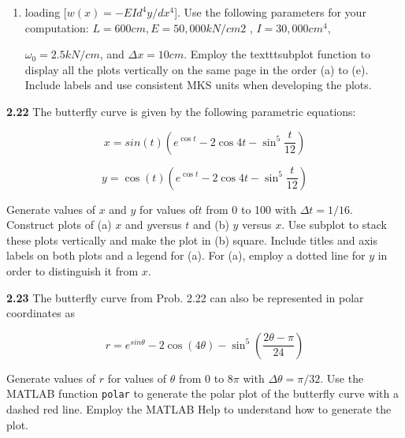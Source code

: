 \documentclass[../main.tex]{subfiles}
\begin{document}
\begin{multicols}{2}
\begin{enumerate}[label=(\alph*)]
\item loading [$w(x) = -EId^4 y/dx^4$].
Use the following parameters for your computation:
$L = 600 cm, E = 50,000 kN/cm2$ , $I = 30,000 cm^4$,

$\omega_0 = 2.5 kN/cm$, and $\Delta x = 10 cm$. Employ the texttt{subplot}
function to display all the plots vertically on the same page
in the order (a) to (e). Include labels and use consistent MKS
units when developing the plots.
\end{enumerate}

\textbf{2.22} The butterfly curve is given by the following parametric equations:

$$x = sin(t)\left( e^{\cos t} - 2 \cos 4t - \sin^5 \dfrac{t}{12} \right)$$

$$y = \cos(t)\left( e^{\cos t} - 2 \cos 4t - \sin^5 \dfrac{t}{12} \right)$$

Generate values of $x$ and $y$ for values of$ t$ from 0 to 100 with
$\Delta t = 1/16$. Construct plots of (a) $x$ and $y $versus $t$ and (b) $y$
versus $x$. Use subplot to stack these plots vertically and
make the plot in (b) square. Include titles and axis labels on
both plots and a legend for (a). For (a), employ a dotted line
for $y$ in order to distinguish it from $x$.


\textbf{2.23} The butterfly curve from Prob. 2.22 can also be represented in polar coordinates as



$$r= e^{sin \theta}-2\cos(4\theta )- \sin^5 \left(\dfrac{2\theta - \pi }{24} \right) $$

Generate values of $r$ for values of $\theta$ from 0 to $8\pi$ with
$\Delta\theta = \pi/32$. Use the MATLAB function \texttt{polar} to generate
the polar plot of the butterfly curve with a dashed red line.
Employ the MATLAB Help to understand how to generate
the plot.



\end{multicols}
\end{document}
